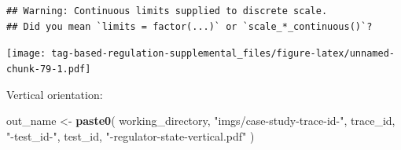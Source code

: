 \documentclass[
]{book}
\newenvironment{Shaded}{\begin{snugshade}}{\end{snugshade}}
\newcommand{\KeywordTok}[1]{\textcolor[rgb]{0.13,0.29,0.53}{\textbf{#1}}}
\newcommand{\NormalTok}[1]{#1}
\newcommand{\StringTok}[1]{\textcolor[rgb]{0.31,0.60,0.02}{#1}}
\begin{document}
\begin{verbatim}
## Warning: Continuous limits supplied to discrete scale.
## Did you mean `limits = factor(...)` or `scale_*_continuous()`?
\end{verbatim}

\texttt{[image: tag-based-regulation-supplemental\_files/figure-latex/unnamed-chunk-79-1.pdf]}

Vertical orientation:

\begin{Shaded}
\begin{Highlighting}[]
\NormalTok{out\_name \textless{}{-}}\StringTok{ }\KeywordTok{paste0}\NormalTok{(}
\NormalTok{  working\_directory,}
  \StringTok{"imgs/case{-}study{-}trace{-}id{-}"}\NormalTok{,}
\NormalTok{   trace\_id,}
   \StringTok{"{-}test\_id{-}"}\NormalTok{,}
\NormalTok{   test\_id,}
   \StringTok{"{-}regulator{-}state{-}vertical.pdf"}
\NormalTok{)}


\end{Highlighting}
\end{Shaded}
\end{document}
